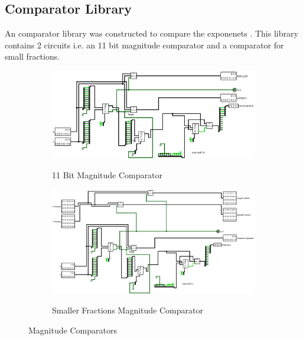 \documentclass[12pt]{article}
\begin{document}
\subsection{Comparator Library}
An comparator library was constructed to compare the exponenets . This library contains 2 circuits i.e. an 11 bit magnitude comparator and a comparator for small fractions.
\begin{figure}[H]
    \centering
    \begin{subfigure}{\textwidth}
    \includegraphics[width=\textwidth]
        {Comparator_11_bit.jpg}
        \label{fig:11bitmagcomp}
    \caption{11 Bit Magnitude Comparator}
        
    \end{subfigure}
    \begin{subfigure}{\textwidth}
    \includegraphics[width=\textwidth]
        {Comparator_With_Smaller_Fraction.jpg}
        \label{fig:smfracmagcomp}
    \caption{Smaller Fractions Magnitude Comparator}
        
    \end{subfigure}
    \label{fig:magcomps}
    \caption{Magnitude Comparators}
        
\end{figure}
\newpage
\end{document}
